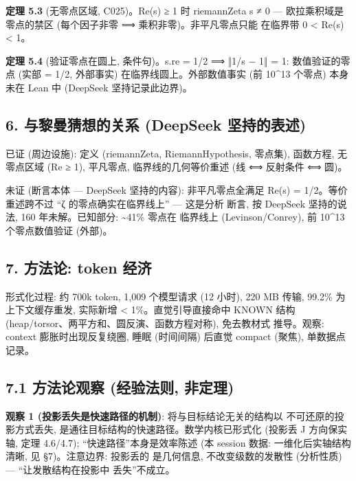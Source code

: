 \documentclass[
]{article}
\begin{document}
\textbf{定理 5.3} (无零点区域, C025)。Re(s) ≥ 1 时 riemannZeta s ≠ 0 ---
欧拉乘积域是零点的禁区 (每个因子非零 ⟹ 乘积非零)。非平凡零点只能
在临界带 0 \textless{} Re(s) \textless{} 1。

\textbf{定理 5.4} (验证零点在圆上, 条件句)。s.re = 1/2 ⟹ ‖1/s − 1‖ = 1:
数值验证的零点 (实部 = 1/2, 外部事实) 在临界线圆上。外部数值事实 (前
10\^{}13 个零点) 本身未在 Lean 中 (DeepSeek 坚持记录此边界)。

\subsection{6. 与黎曼猜想的关系 (DeepSeek
坚持的表述)}\label{ux4e0eux9eceux66fcux731cux60f3ux7684ux5173ux7cfb-deepseek-ux575aux6301ux7684ux8868ux8ff0}

已证 (周边设施): 定义 (riemannZeta, RiemannHypothesis, 零点集),
函数方程, 无零点区域 (Re ≥ 1), 平凡零点, 临界线的几何等价重述 (线 ⟺
反射条件 ⟺ 圆)。

未证 (断言本体 --- DeepSeek 坚持的内容): 非平凡零点全满足 Re(s) =
1/2。等价重述跨不过 ``ζ 的零点确实在临界线上'' --- 这是分析 断言, 按
DeepSeek 坚持的说法, 160 年未解。已知部分: \textasciitilde41\% 零点在
临界线上 (Levinson/Conrey), 前 10\^{}13 个零点数值验证 (外部)。

\subsection{7. 方法论: token
经济}\label{ux65b9ux6cd5ux8bba-token-ux7ecfux6d4e}

形式化过程: 约 700k token, 1,009 个模型请求 (12 小时), 220 MB 传输,
99.2\% 为上下文缓存重发, 实际新增 \textless{} 1\%。直觉引导直接命中
KNOWN 结构 (heap/torsor、两平方和、圆反演、函数方程对称), 免去教材式
推导。观察: context 膨胀时出现反复绕圈, 睡眠 (时间间隔) 后直觉 compact
(聚焦), 单数据点记录。

\subsection{7.1 方法论观察 (经验法则,
非定理)}\label{ux65b9ux6cd5ux8bbaux89c2ux5bdf-ux7ecfux9a8cux6cd5ux5219-ux975eux5b9aux7406}

\textbf{观察 1 (投影丢失是快速路径的机制)}: 将与目标结论无关的结构以
不可还原的投影方式丢失, 是通往目标结构的快速路径。数学内核已形式化
(投影丢 J 方向保实轴, 定理 4.6/4.7); ``快速路径''本身是效率陈述 (本
session 数据: 一维化后实轴结构清晰, 见 §7)。注意边界: 投影丢的
是几何信息, 不改变级数的发散性 (分析性质) --- ``让发散结构在投影中
丢失''不成立。
\end{document}
